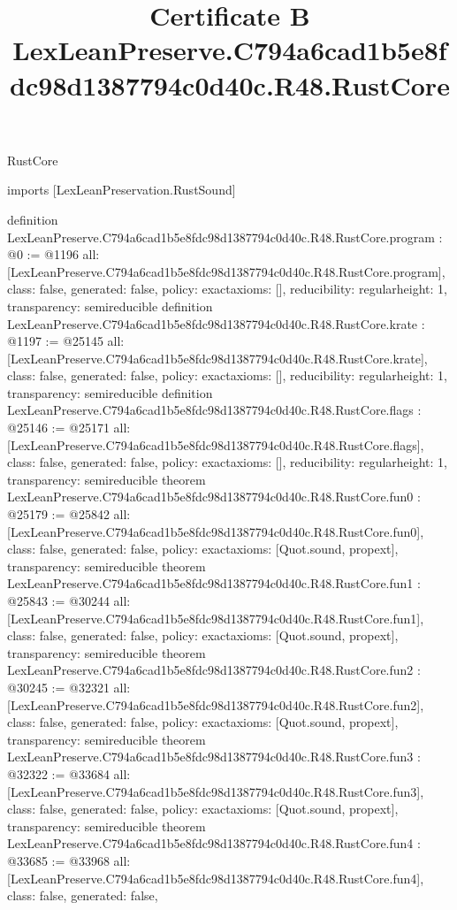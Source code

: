 \begin{lexlean}{RustCore}
\title{Certificate B LexLeanPreserve.C794a6cad1b5e8fdc98d1387794c0d40c.R48.RustCore}
\begin{coremodule}
imports [LexLeanPreservation.RustSound]

definition LexLeanPreserve.C794a6cad1b5e8fdc98d1387794c0d40c.R48.RustCore.program : @0 := @1196 {
  all: [LexLeanPreserve.C794a6cad1b5e8fdc98d1387794c0d40c.R48.RustCore.program],
  class: false,
  generated: false,
  policy: exact{axioms: []},
  reducibility: regular{height: 1},
  transparency: semireducible
}
definition LexLeanPreserve.C794a6cad1b5e8fdc98d1387794c0d40c.R48.RustCore.krate : @1197 := @25145 {
  all: [LexLeanPreserve.C794a6cad1b5e8fdc98d1387794c0d40c.R48.RustCore.krate],
  class: false,
  generated: false,
  policy: exact{axioms: []},
  reducibility: regular{height: 1},
  transparency: semireducible
}
definition LexLeanPreserve.C794a6cad1b5e8fdc98d1387794c0d40c.R48.RustCore.flags : @25146 := @25171 {
  all: [LexLeanPreserve.C794a6cad1b5e8fdc98d1387794c0d40c.R48.RustCore.flags],
  class: false,
  generated: false,
  policy: exact{axioms: []},
  reducibility: regular{height: 1},
  transparency: semireducible
}
theorem LexLeanPreserve.C794a6cad1b5e8fdc98d1387794c0d40c.R48.RustCore.fun0 : @25179 := @25842 {
  all: [LexLeanPreserve.C794a6cad1b5e8fdc98d1387794c0d40c.R48.RustCore.fun0],
  class: false,
  generated: false,
  policy: exact{axioms: [Quot.sound, propext]},
  transparency: semireducible
}
theorem LexLeanPreserve.C794a6cad1b5e8fdc98d1387794c0d40c.R48.RustCore.fun1 : @25843 := @30244 {
  all: [LexLeanPreserve.C794a6cad1b5e8fdc98d1387794c0d40c.R48.RustCore.fun1],
  class: false,
  generated: false,
  policy: exact{axioms: [Quot.sound, propext]},
  transparency: semireducible
}
theorem LexLeanPreserve.C794a6cad1b5e8fdc98d1387794c0d40c.R48.RustCore.fun2 : @30245 := @32321 {
  all: [LexLeanPreserve.C794a6cad1b5e8fdc98d1387794c0d40c.R48.RustCore.fun2],
  class: false,
  generated: false,
  policy: exact{axioms: [Quot.sound, propext]},
  transparency: semireducible
}
theorem LexLeanPreserve.C794a6cad1b5e8fdc98d1387794c0d40c.R48.RustCore.fun3 : @32322 := @33684 {
  all: [LexLeanPreserve.C794a6cad1b5e8fdc98d1387794c0d40c.R48.RustCore.fun3],
  class: false,
  generated: false,
  policy: exact{axioms: [Quot.sound, propext]},
  transparency: semireducible
}
theorem LexLeanPreserve.C794a6cad1b5e8fdc98d1387794c0d40c.R48.RustCore.fun4 : @33685 := @33968 {
  all: [LexLeanPreserve.C794a6cad1b5e8fdc98d1387794c0d40c.R48.RustCore.fun4],
  class: false,
  generated: false,
}
\end{coremodule}
\end{lexlean}
